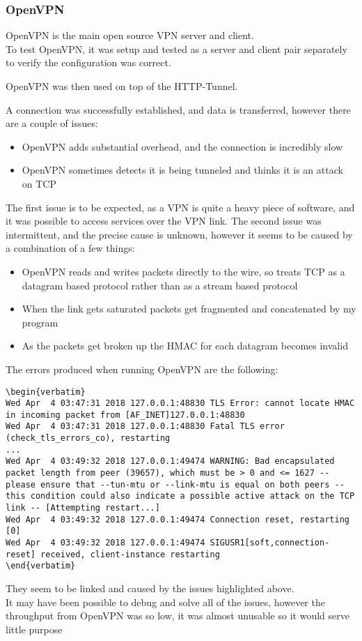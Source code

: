 \subsubsection{OpenVPN}
OpenVPN is the main open source VPN server and client.\\
To test OpenVPN, it was setup and tested as a server and client pair separately to verify the configuration was correct.\par
OpenVPN was then used on top of the HTTP-Tunnel.\par
A connection was successfully established, and data is transferred, however there are a couple of issues:
\begin{itemize}
    \item OpenVPN adds substantial overhead, and the connection is incredibly slow
    \item OpenVPN sometimes detects it is being tunneled and thinks it is an attack on TCP
\end{itemize}
The first issue is to be expected, as a VPN is quite a heavy piece of software, and it was possible to access services over the VPN link.
The second issue was intermittent, and the precise cause is unknown, however it seems to be caused by a combination of a few things:
\begin{itemize}
    \item OpenVPN reads and writes packets directly to the wire, so treats TCP as a datagram based protocol rather than as a stream based protocol
    \item When the link gets saturated packets get fragmented and concatenated by my program
    \item As the packets get broken up the HMAC for each datagram becomes invalid
\end{itemize}
The errors produced when running OpenVPN are the following:
\begin{lstlisting}[language=none,numbers=none,firstline=2,lastline=7]
\begin{verbatim}
Wed Apr  4 03:47:31 2018 127.0.0.1:48830 TLS Error: cannot locate HMAC in incoming packet from [AF_INET]127.0.0.1:48830
Wed Apr  4 03:47:31 2018 127.0.0.1:48830 Fatal TLS error (check_tls_errors_co), restarting
...
Wed Apr  4 03:49:32 2018 127.0.0.1:49474 WARNING: Bad encapsulated packet length from peer (39657), which must be > 0 and <= 1627 -- please ensure that --tun-mtu or --link-mtu is equal on both peers -- this condition could also indicate a possible active attack on the TCP link -- [Attempting restart...]
Wed Apr  4 03:49:32 2018 127.0.0.1:49474 Connection reset, restarting [0]
Wed Apr  4 03:49:32 2018 127.0.0.1:49474 SIGUSR1[soft,connection-reset] received, client-instance restarting
\end{verbatim}
\end{lstlisting}
They seem to be linked and caused by the issues highlighted above.\\
It may have been possible to debug and solve all of the issues, however the throughput from OpenVPN was so low, it was almost unusable so it would serve little purpose

